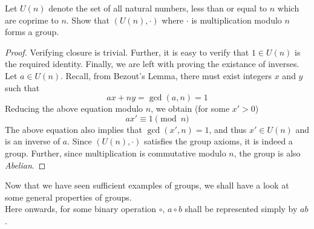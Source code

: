 \begin{exercise}
	Let $U(n)$ denote the set of all natural numbers, less than or equal to $n$ which are coprime to $n$. Show that $(U(n),\cdot)$ where $\cdot$ is multiplication modulo $n$ forms a group.
\end{exercise}
\begin{proof}
	Verifying closure is trivial. Further, it is easy to verify that $1\in U(n)$ is the required identity. Finally, we are left with proving the existance of inverses. Let $a\in U(n)$. Recall, from Bezout's Lemma, there must exist integers $x$ and $y$ such that 
	$$
	ax+ny=\gcd(a,n) = 1
	$$
	Reducing the above equation modulo $n$, we obtain (for some $x'>0$)
	$$
	ax'\equiv1\pmod n
	$$
	The above equation also implies that $\gcd(x',n)=1$, and thus $x'\in U(n)$ and is an inverse of $a$. Since $(U(n),\cdot)$ satisfies the group axioms, it is indeed a group. Further, since multiplication is commutative modulo $n$, the group is also \textit{Abelian}.
\end{proof}


Now that we have seen sufficient examples of groups, we shall have a look at some general properties of groups.\\

Here onwards, for some binary operation $\circ$, $a\circ b$ shall be represented simply by $ab$.

